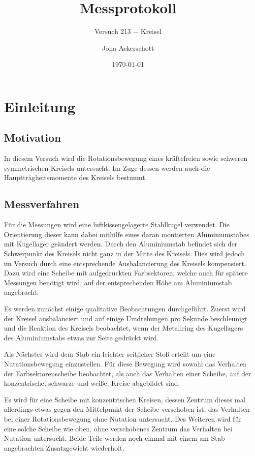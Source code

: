 \documentclass[12pt,a4paper,german]{scrartcl}
\author{Jona Ackerschott}
\title{Messprotokoll}
\subtitle{Versuch 213 $-$ Kreisel}
\date{\today}
\numberwithin{equation}{section}
\begin{document}
  \maketitle

  \tableofcontents

  \section{Einleitung}
  \subsection{Motivation}
  In diesem Versuch wird die Rotationsbewegung eines kräftefreien sowie schweren symmetrischen Kreisels untersucht.
  Im Zuge dessen werden auch die Hauptträgheitsmomente des Kreisels bestimmt.

  \subsection{Messverfahren}
  Für die Messungen wird eine luftkissengelagerte Stahlkugel verwendet. Die Orientierung dieser kann dabei mithilfe eines daran montierten Aluminiumstabes mit Kugellager geändert werden.
  Durch den Aluminiumstab befindet sich der Schwerpunkt des Kreisels nicht ganz in der Mitte des Kreisels. Dies wird jedoch im Versuch durch eine entsprechende Ausbalancierung des Kreisels kompensiert. Dazu wird eine Scheibe mit aufgedruckten Farbsektoren, welche auch für spätere Messungen benötigt wird, auf der entsprechenden Höhe am Aluminiumstab angebracht.

  Es werden zunächst einige qualitative Beobachtungen durchgeführt.
  Zuerst wird der Kreisel ausbalanciert und auf einige Umdrehungen pro Sekunde beschleunigt und die Reaktion des Kreisels beobachtet, wenn der Metallring des Kugellagers des Aluminiumstabs etwas zur Seite gedrückt wird.

  Als Nächstes wird dem Stab ein leichter seitlicher Stoß erteilt um eine Nutationsbewegung einzustellen. Für diese Bewegung wird sowohl das Verhalten der Farbsektorenscheibe beobachtet, als auch das Verhalten einer Scheibe, auf der konzentrische, schwarze und weiße, Kreise abgebildet sind.

  Es wird für eine Scheibe mit konzentrischen Kreisen, dessen Zentrum dieses mal allerdings etwas gegen den Mittelpunkt der Scheibe verschoben ist, das Verhalten bei einer Rotationsbewegung ohne Nutation untersucht.
  Des Weiteren wird für eine solche Scheibe wie oben, ohne verschobenes Zentrum das Verhalten bei Nutation untersucht.
  Beide Teile werden noch einmal mit einem am Stab angebrachten Zusatzgewicht wiederholt.
\end{document}

